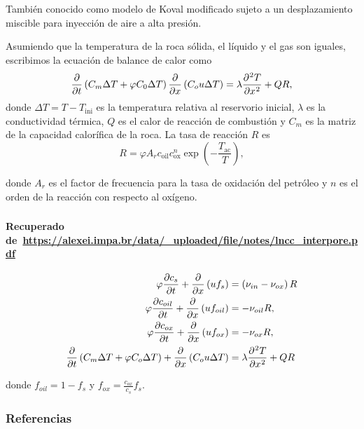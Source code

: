 \documentclass[
  aspectratio=1610,
  c,
  handout,
  9pt,
  spanish
]{beamer}
\begin{document}
\begin{frame}
    \frametitle{\secname}

    También conocido como modelo de Koval modificado sujeto a un
    desplazamiento miscible para inyección de aire a alta presión.

    Asumiendo que la temperatura de la roca sólida, el líquido y el gas son iguales,
    escribimos la ecuación de balance de calor como
    \begin{equation*}
        \diffp{}{t}
        \left(
        C_{m}\Delta T+
        \varphi C_{0}\Delta T\right)
        \diffp{}{x}
        \left(C_{o} u\Delta T\right)=
        \lambda
        \diffp[2]{T}{x}+
        QR,
    \end{equation*}
    donde $\Delta T=T-T_{\text{ini}}$ es la temperatura relativa al reservorio inicial,
    $\lambda$ es la conductividad térmica, $Q$ es el calor de reacción de combustión y $C_{m}$
    es la matriz de la capacidad calorífica de la roca.
    La tasa de reacción $R$ es
    \begin{equation*}
        R=\varphi A_{r}c_{\text{oil}}c^{n}_{\text{ox}}
        \exp\left(-\frac{T_{\text{ac}}}{T}\right),
    \end{equation*}

    donde $A_{r}$ es el factor de frecuencia para la tasa de oxidación del petróleo y $n$ es
    el orden de la reacción con respecto al oxígeno.
\end{frame}

\begin{frame}
    \frametitle{\secname}
    \framesubtitle{Recuperado de~\url{https://alexei.impa.br/data/_uploaded/file/notes/lncc_interpore.pdf}}
    \begin{align}
        \varphi
        \diffp{c_{s}}{t}+
        \diffp{}{x}
        \left(uf_{s}\right)         & =
        \left(\nu_{in}-\nu_{ox}\right)R \\
        \varphi
        \diffp{c_{oil}}{t}+
        \diffp{}{x}
        \left(uf_{oil}\right)       & =
        -\nu_{oil}R,                    \\
        \varphi
        \diffp{c_{ox}}{t}+
        \diffp{}{x}
        \left(uf_{ox}\right)        & =
        -\nu_{ox}R,                     \\
        \diffp{}{t}
        \left(C_{m}\Delta T+\varphi C_{o}\Delta T\right)+
        \diffp{}{x}
        \left(C_{o}u\Delta T\right) & =
        \lambda
        \diffp[2]{T}{x}+QR
    \end{align}

    donde $f_{oil}=1-f_{s}$ y $f_{ox}=\frac{c_{ox}}{c_s}f_{s}$.
\end{frame}

\begin{frame}\transblindsvertical
    \frametitle{Referencias}

    \nocite{*}
    \printbibliography[heading=none]
\end{frame}
\end{document}
